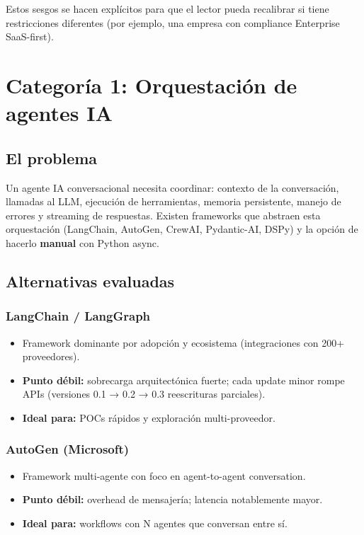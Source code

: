 \documentclass[11pt,a4paper]{article}
\begin{document}
Estos sesgos se hacen explícitos para que el lector pueda recalibrar si tiene restricciones diferentes (por ejemplo, una empresa con compliance Enterprise SaaS-first).

\newpage

\section{Categoría 1: Orquestación de agentes IA}

\subsection{El problema}

Un agente IA conversacional necesita coordinar: contexto de la conversación, llamadas al LLM, ejecución de herramientas, memoria persistente, manejo de errores y streaming de respuestas. Existen frameworks que abstraen esta orquestación (LangChain, AutoGen, CrewAI, Pydantic-AI, DSPy) y la opción de hacerlo \textbf{manual} con Python async.

\subsection{Alternativas evaluadas}

\subsubsection{LangChain / LangGraph}
\begin{itemize}[leftmargin=*,itemsep=0pt]
\item Framework dominante por adopción y ecosistema (integraciones con 200+ proveedores).
\item \textbf{Punto débil:} sobrecarga arquitectónica fuerte; cada update minor rompe APIs (versiones 0.1 → 0.2 → 0.3 reescrituras parciales).
\item \textbf{Ideal para:} POCs rápidos y exploración multi-proveedor.
\end{itemize}

\subsubsection{AutoGen (Microsoft)}
\begin{itemize}[leftmargin=*,itemsep=0pt]
\item Framework multi-agente con foco en agent-to-agent conversation.
\item \textbf{Punto débil:} overhead de mensajería; latencia notablemente mayor.
\item \textbf{Ideal para:} workflows con N agentes que conversan entre sí.
\end{itemize}
\end{document}
